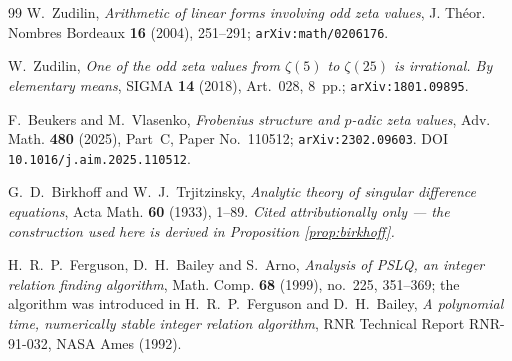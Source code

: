 \documentclass[11pt,reqno]{amsart}
\theoremstyle{plain}
\theoremstyle{definition}
\theoremstyle{remark}
\begin{document}
\begin{thebibliography}{99}
W.~Zudilin, \emph{Arithmetic of linear forms involving odd zeta values},
J. Th\'eor. Nombres Bordeaux \textbf{16} (2004), 251--291;
\texttt{arXiv:math/0206176}.

W.~Zudilin, \emph{One of the odd zeta values from $\zeta(5)$ to $\zeta(25)$ is irrational.
By elementary means}, SIGMA \textbf{14} (2018), Art.~028, 8~pp.;
\texttt{arXiv:1801.09895}.

F.~Beukers and M.~Vlasenko, \emph{Frobenius structure and $p$-adic zeta values},
Adv. Math. \textbf{480} (2025), Part~C, Paper No.~110512;
\texttt{arXiv:2302.09603}. DOI \texttt{10.1016/j.aim.2025.110512}.

G.~D.~Birkhoff and W.~J.~Trjitzinsky, \emph{Analytic theory of singular difference equations},
Acta Math. \textbf{60} (1933), 1--89.
\emph{Cited attributionally only --- the construction used here is derived in Proposition
\ref{prop:birkhoff}.}

H.~R.~P.~Ferguson, D.~H.~Bailey and S.~Arno, \emph{Analysis of PSLQ, an integer relation
finding algorithm}, Math. Comp. \textbf{68} (1999), no.~225, 351--369; the algorithm was
introduced in H.~R.~P.~Ferguson and D.~H.~Bailey, \emph{A polynomial time, numerically stable
integer relation algorithm}, RNR Technical Report RNR-91-032, NASA Ames (1992).

\end{thebibliography}
\end{document}
